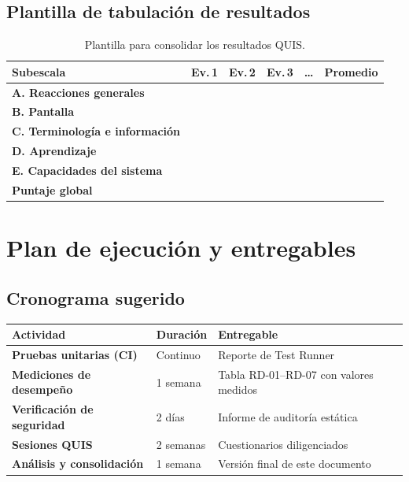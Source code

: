 \documentclass[12pt, a4paper]{article}
\begin{document}
\subsection{Plantilla de tabulación de resultados}

\begin{table}[H]
  \centering
  \caption{Plantilla para consolidar los resultados QUIS.}
  \renewcommand{\arraystretch}{1.4}
  \begin{tabular}{>{\bfseries}p{4cm} >{\centering\arraybackslash}p{1.5cm}
                  >{\centering\arraybackslash}p{1.5cm} >{\centering\arraybackslash}p{1.5cm}
                  >{\centering\arraybackslash}p{1.5cm} >{\centering\arraybackslash}p{1.5cm}}
    \toprule
    Subescala & Ev.\,1 & Ev.\,2 & Ev.\,3 & \ldots & Promedio \\
    \midrule
    A. Reacciones generales      &  &  &  &  &  \\
    B. Pantalla                  &  &  &  &  &  \\
    C. Terminología e información &  &  &  &  &  \\
    D. Aprendizaje               &  &  &  &  &  \\
    E. Capacidades del sistema   &  &  &  &  &  \\
    \midrule
    \textbf{Puntaje global}      &  &  &  &  &  \\
    \bottomrule
  \end{tabular}
\end{table}

\section{Plan de ejecución y entregables}

\subsection{Cronograma sugerido}

\begin{table}[H]
  \centering
  \renewcommand{\arraystretch}{1.3}
  \begin{tabular}{>{\bfseries}p{4cm} p{4cm} p{4cm}}
    \toprule
    Actividad & Duración & Entregable \\
    \midrule
    Pruebas unitarias (CI) & Continuo  & Reporte de Test Runner \\
    Mediciones de desempeño & 1 semana  & Tabla RD-01--RD-07 con valores medidos \\
    Verificación de seguridad & 2 días   & Informe de auditoría estática \\
    Sesiones QUIS           & 2 semanas & Cuestionarios diligenciados \\
    Análisis y consolidación & 1 semana  & Versión final de este documento \\
    \bottomrule
  \end{tabular}
\end{table}
\end{document}
